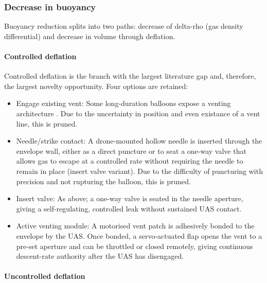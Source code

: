 \subsubsection*{Decrease in buoyancy}

Buoyancy reduction splits into two paths: decrease of delta-rho (gas density differential) and decrease in volume through deflation.
\vspace{-10pt}
\paragraph{Controlled deflation}

Controlled deflation is the branch with the largest literature gap and, therefore, the largest novelty opportunity. Four options are retained:

\begin{itemize}[leftmargin=*]

    \item Engage existing vent: Some long-duration balloons expose a venting architecture \cite{Voss2005AltitudeBalloons}. Due to the uncertainty in position and even existance of a vent line, this is pruned.

    \item Needle/strike contact: A drone-mounted hollow needle is inserted through the envelope wall, either as a direct puncture or to seat a one-way valve that allows gas to escape at a controlled rate without requiring the needle to remain in place (insert valve variant). Due to the difficulty of puncturing with precision and not rupturing the balloon, this is pruned.

    \item Insert valve: As above; a one-way valve is seated in the needle aperture, giving a self-regulating, controlled leak without sustained UAS contact.

    \item Active venting module: A motorised vent patch is adhesively bonded to the envelope by the UAS. Once bonded, a servo-actuated flap opens the vent to a pre-set aperture and can be throttled or closed remotely, giving continuous descent-rate authority after the UAS has disengaged.

\end{itemize}
\vspace{-15pt}
\paragraph{Uncontrolled deflation}

